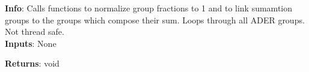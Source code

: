\textbf{Info}: Calls functions to normalize group fractions to 1 and to link
sumamtion groups to the groups which compose their sum. Loops through all ADER
groups. Not thread safe. \\

\noindent \textbf{Inputs}: None

\noindent \textbf{Returns}: void
